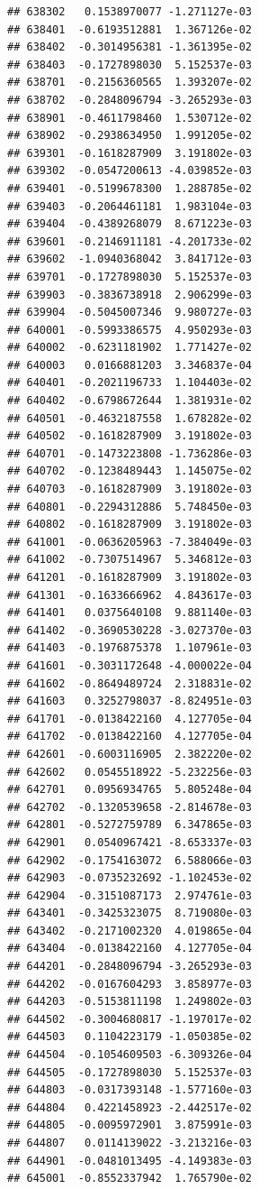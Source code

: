 \documentclass[ignorenonframetext,]{beamer}
\begin{document}
\begin{frame}[fragile]
\begin{verbatim}
## 638302   0.1538970077 -1.271127e-03
## 638401  -0.6193512881  1.367126e-02
## 638402  -0.3014956381 -1.361395e-02
## 638403  -0.1727898030  5.152537e-03
## 638701  -0.2156360565  1.393207e-02
## 638702  -0.2848096794 -3.265293e-03
## 638901  -0.4611798460  1.530712e-02
## 638902  -0.2938634950  1.991205e-02
## 639301  -0.1618287909  3.191802e-03
## 639302  -0.0547200613 -4.039852e-03
## 639401  -0.5199678300  1.288785e-02
## 639403  -0.2064461181  1.983104e-03
## 639404  -0.4389268079  8.671223e-03
## 639601  -0.2146911181 -4.201733e-02
## 639602  -1.0940368042  3.841712e-03
## 639701  -0.1727898030  5.152537e-03
## 639903  -0.3836738918  2.906299e-03
## 639904  -0.5045007346  9.980727e-03
## 640001  -0.5993386575  4.950293e-03
## 640002  -0.6231181902  1.771427e-02
## 640003   0.0166881203  3.346837e-04
## 640401  -0.2021196733  1.104403e-02
## 640402  -0.6798672644  1.381931e-02
## 640501  -0.4632187558  1.678282e-02
## 640502  -0.1618287909  3.191802e-03
## 640701  -0.1473223808 -1.736286e-03
## 640702  -0.1238489443  1.145075e-02
## 640703  -0.1618287909  3.191802e-03
## 640801  -0.2294312886  5.748450e-03
## 640802  -0.1618287909  3.191802e-03
## 641001  -0.0636205963 -7.384049e-03
## 641002  -0.7307514967  5.346812e-03
## 641201  -0.1618287909  3.191802e-03
## 641301  -0.1633666962  4.843617e-03
## 641401   0.0375640108  9.881140e-03
## 641402  -0.3690530228 -3.027370e-03
## 641403  -0.1976875378  1.107961e-03
## 641601  -0.3031172648 -4.000022e-04
## 641602  -0.8649489724  2.318831e-02
## 641603   0.3252798037 -8.824951e-03
## 641701  -0.0138422160  4.127705e-04
## 641702  -0.0138422160  4.127705e-04
## 642601  -0.6003116905  2.382220e-02
## 642602   0.0545518922 -5.232256e-03
## 642701   0.0956934765  5.805248e-04
## 642702  -0.1320539658 -2.814678e-03
## 642801  -0.5272759789  6.347865e-03
## 642901   0.0540967421 -8.653337e-03
## 642902  -0.1754163072  6.588066e-03
## 642903  -0.0735232692 -1.102453e-02
## 642904  -0.3151087173  2.974761e-03
## 643401  -0.3425323075  8.719080e-03
## 643402  -0.2171002320  4.019865e-04
## 643404  -0.0138422160  4.127705e-04
## 644201  -0.2848096794 -3.265293e-03
## 644202  -0.0167604293  3.858977e-03
## 644203  -0.5153811198  1.249802e-03
## 644502  -0.3004680817 -1.197017e-02
## 644503   0.1104223179 -1.050385e-02
## 644504  -0.1054609503 -6.309326e-04
## 644505  -0.1727898030  5.152537e-03
## 644803  -0.0317393148 -1.577160e-03
## 644804   0.4221458923 -2.442517e-02
## 644805  -0.0095972901  3.875991e-03
## 644807   0.0114139022 -3.213216e-03
## 644901  -0.0481013495 -4.149383e-03
## 645001  -0.8552337942  1.765790e-02

\end{verbatim}
\end{frame}
\end{document}
